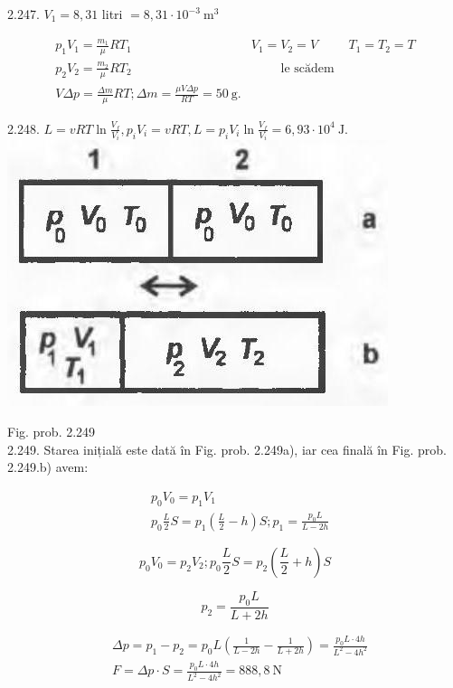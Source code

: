 \documentclass[10pt]{article}
\begin{document}
2.247. $V_{1}=8,31$ litri $=8,31 \cdot 10^{-3} \mathrm{~m}^{3}$

$$
\begin{array}{lrr}
p_{1} V_{1}=\frac{m_{1}}{\mu} R T_{1} & V_{1}=V_{2}=V & T_{1}=T_{2}=T \\
p_{2} V_{2}=\frac{m_{2}}{\mu} R T_{2} & \quad \quad \text { le scădem } & \\
V \Delta p=\frac{\Delta m}{\mu} R T ; \Delta m=\frac{\mu V \Delta p}{R T}=50 \mathrm{~g} . &
\end{array}
$$

2.248. $L=v R T \ln \frac{V_{f}}{V_{i}}, p_{i} V_{i}=v R T, L=p_{i} V_{i} \ln \frac{V_{f}}{V_{i}}=6,93 \cdot 10^{4} \mathrm{~J}$.\\
\includegraphics[max width=\textwidth, center]{2025_07_01_5b3ff9fa0d508c8e9f17g-324}

Fig. prob. 2.249\\
2.249. Starea inițială este dată în Fig. prob. 2.249a), iar cea finală în Fig. prob. 2.249.b) avem:

$$
\begin{aligned}
& p_{0} V_{0}=p_{1} V_{1} \\
& p_{0} \frac{L}{2} S=p_{1}\left(\frac{L}{2}-h\right) S ; p_{1}=\frac{p_{0} L}{L-2 h}
\end{aligned}
$$

$$
p_{0} V_{0}=p_{2} V_{2} ; p_{0} \frac{L}{2} S=p_{2}\left(\frac{L}{2}+h\right) S
$$

$$
p_{2}=\frac{p_{0} L}{L+2 h}
$$

$$
\begin{aligned}
& \Delta p=p_{1}-p_{2}=p_{0} L\left(\frac{1}{L-2 h}-\frac{1}{L+2 h}\right)=\frac{p_{0} L \cdot 4 h}{L^{2}-4 h^{2}} \\
& F=\Delta p \cdot S=\frac{p_{0} L \cdot 4 h}{L^{2}-4 h^{2}}=888,8 \mathrm{~N}
\end{aligned}
$$
\end{document}
